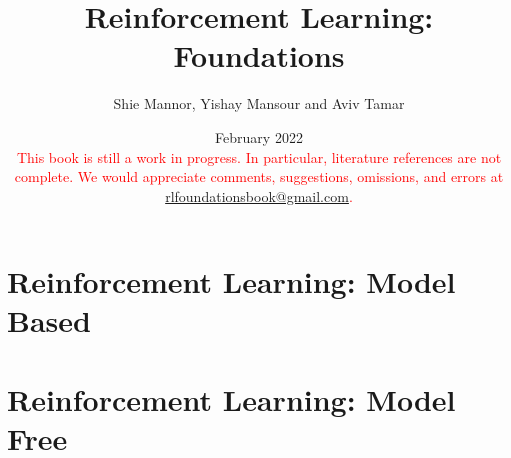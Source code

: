 \documentclass[12pt]{book}
\title{Reinforcement Learning: Foundations}
\date{February 2022
\\
  \textcolor{red}{This book is still a work in progress. In particular, literature references are not complete. We would appreciate comments, suggestions, omissions, and errors at \url{rlfoundationsbook@gmail.com}. }
}
\author{Shie Mannor, Yishay Mansour and Aviv Tamar}
\begin{document}
\maketitle

\tableofcontents

% 

% 

% 

% 

% 

% 

\chapter{Reinforcement Learning: Model Based}\label{chapter-model-based}


\chapter{Reinforcement Learning: Model Free}
\label{chapter:learning-model-free}

\newpage

\end{document}
